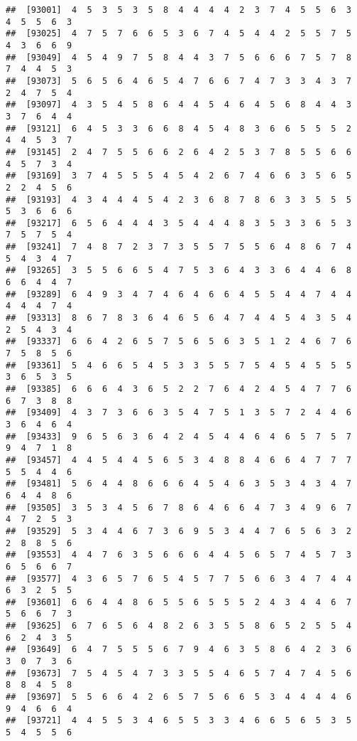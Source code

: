 \documentclass[
]{book}
\begin{document}
\begin{verbatim}
##  [93001]  4  5  3  5  3  5  8  4  4  4  4  2  3  7  4  5  5  6  3  4  5  5  6  3
##  [93025]  4  7  5  7  6  6  5  3  6  7  4  5  4  4  2  5  5  7  5  4  3  6  6  9
##  [93049]  4  5  4  9  7  5  8  4  4  3  7  5  6  6  6  7  5  7  8  7  4  4  5  3
##  [93073]  5  6  5  6  4  6  5  4  7  6  6  7  4  7  3  3  4  3  7  2  4  7  5  4
##  [93097]  4  3  5  4  5  8  6  4  4  5  4  6  4  5  6  8  4  4  3  3  7  6  4  4
##  [93121]  6  4  5  3  3  6  6  8  4  5  4  8  3  6  6  5  5  5  2  4  4  5  3  7
##  [93145]  2  4  7  5  5  6  6  2  6  4  2  5  3  7  8  5  5  6  6  4  5  7  3  4
##  [93169]  3  7  4  5  5  5  4  5  4  2  6  7  4  6  6  3  5  6  5  2  2  4  5  6
##  [93193]  4  3  4  4  4  5  4  2  3  6  8  7  8  6  3  3  5  5  5  5  3  6  6  6
##  [93217]  6  5  6  4  4  4  3  5  4  4  4  8  3  5  3  3  6  5  3  7  5  7  5  4
##  [93241]  7  4  8  7  2  3  7  3  5  5  7  5  5  6  4  8  6  7  4  5  4  3  4  7
##  [93265]  3  5  5  6  6  5  4  7  5  3  6  4  3  3  6  4  4  6  8  6  6  4  4  7
##  [93289]  6  4  9  3  4  7  4  6  4  6  6  4  5  5  4  4  7  4  4  4  4  4  7  4
##  [93313]  8  6  7  8  3  6  4  6  5  6  4  7  4  4  5  4  3  5  4  2  5  4  3  4
##  [93337]  6  6  4  2  6  5  7  5  6  5  6  3  5  1  2  4  6  7  6  7  5  8  5  6
##  [93361]  5  4  6  6  5  4  5  3  3  5  5  7  5  4  5  4  5  5  5  3  6  5  3  5
##  [93385]  6  6  6  4  3  6  5  2  2  7  6  4  2  4  5  4  7  7  6  6  7  3  8  8
##  [93409]  4  3  7  3  6  6  3  5  4  7  5  1  3  5  7  2  4  4  6  3  6  4  6  4
##  [93433]  9  6  5  6  3  6  4  2  4  5  4  4  6  4  6  5  7  5  7  9  4  7  1  8
##  [93457]  4  4  5  4  4  5  6  5  3  4  8  8  4  6  6  4  7  7  7  5  5  4  4  6
##  [93481]  5  6  4  4  8  6  6  6  4  5  4  6  3  5  3  4  3  4  7  6  4  4  8  6
##  [93505]  3  5  3  4  5  6  7  8  6  4  6  6  4  7  3  4  9  6  7  4  7  2  5  3
##  [93529]  5  3  4  4  6  7  3  6  9  5  3  4  4  7  6  5  6  3  2  2  8  8  5  6
##  [93553]  4  4  7  6  3  5  6  6  6  4  4  5  6  5  7  4  5  7  3  6  5  6  6  7
##  [93577]  4  3  6  5  7  6  5  4  5  7  7  5  6  6  3  4  7  4  4  6  3  2  5  5
##  [93601]  6  6  4  4  8  6  5  5  6  5  5  5  2  4  3  4  4  6  7  5  6  6  7  3
##  [93625]  6  7  6  5  6  4  8  2  6  3  5  5  8  6  5  2  5  5  4  6  2  4  3  5
##  [93649]  6  4  7  5  5  5  6  7  9  4  6  3  5  8  6  4  2  3  6  3  0  7  3  6
##  [93673]  7  5  4  5  4  7  3  3  5  5  4  6  5  7  4  7  4  5  6  8  8  4  5  8
##  [93697]  5  5  6  6  4  2  6  5  7  5  6  6  5  3  4  4  4  4  6  9  4  6  6  4
##  [93721]  4  4  5  5  3  4  6  5  5  3  3  4  6  6  5  6  5  3  5  5  4  5  5  6

\end{verbatim}
\end{document}
